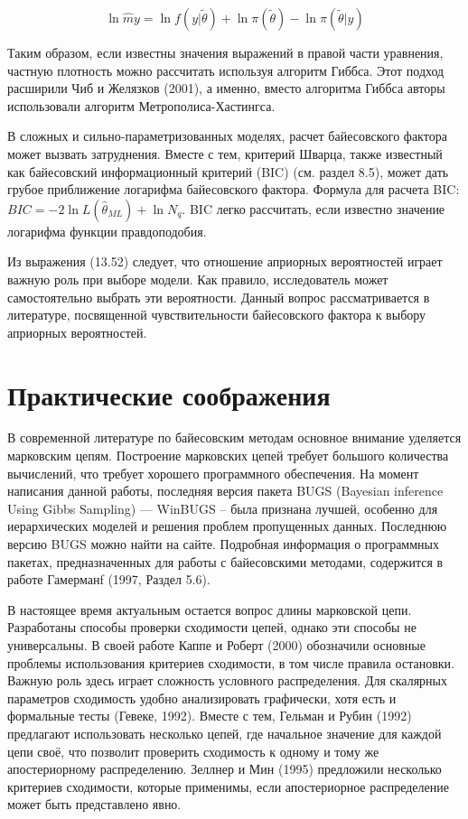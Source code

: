 \begin{equation}
\ln \hat{m}y=\ln {f(y|\tilde{\theta})}+\ln {\pi(\tilde{\theta})}-\ln {\pi(\tilde{\theta}|y)}
\end{equation}

Таким образом, если известны значения выражений в правой части уравнения, частную плотность можно рассчитать используя алгоритм Гиббса. Этот подход расширили Чиб и Желязков (2001), а именно, вместо алгоритма Гиббса авторы использовали алгоритм Метрополиса-Хастингса.

В сложных и сильно-параметризованных моделях, расчет байесовского фактора может вызвать затруднения. Вместе с тем,  критерий Шварца, также известный как байесовский информационный критерий (BIC) (см. раздел 8.5), может дать грубое приближение логарифма байесовского фактора. Формула для расчета BIC: $BIC=-2\ln {L}(\hat{\theta}_{ML})+\ln {N_q}$. BIC легко рассчитать, если известно значение логарифма функции правдоподобия.

Из выражения (13.52) следует, что отношение априорных вероятностей играет важную роль при выборе модели. Как правило, исследователь может самостоятельно выбрать эти вероятности. Данный вопрос  рассматривается в литературе, посвященной чувствительности байесовского фактора к выбору априорных вероятностей.

\section{Практические соображения}

В современной литературе по байесовским методам основное внимание уделяется марковским цепям. Построение марковских цепей требует большого количества вычислений, что требует хорошего программного обеспечения. На момент написания данной работы, последняя версия пакета BUGS (Bayesian inference Using Gibbs Sampling) --- WinBUGS -- была признана лучшей, особенно для иерархических моделей и решения проблем пропущенных данных. Последнюю версию BUGS можно найти на сайте. Подробная информация о программных пакетах, предназначенных для работы с байесовскими методами, содержится в работе Гамерманf (1997, Раздел 5.6).

В настоящее время актуальным остается вопрос длины марковской цепи. Разработаны способы проверки сходимости цепей, однако эти способы не универсальны. В своей работе Каппе и Роберт (2000) обозначили основные проблемы использования критериев сходимости, в том числе правила остановки. Важную роль здесь играет сложность условного распределения. Для скалярных параметров сходимость удобно анализировать графически, хотя есть  и формальные тесты (Гевеке, 1992). Вместе с тем,  Гельман и Рубин (1992) предлагают  использовать несколько цепей, где начальное значение для каждой цепи своё, что позволит проверить сходимость к одному и тому же апостериорному распределению. Зеллнер и Мин (1995) предложили несколько критериев сходимости, которые применимы, если апостериорное распределение может быть представлено явно.

